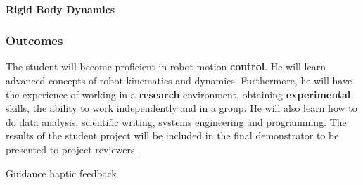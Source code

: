 \paragraph{Rigid Body Dynamics} 

\subsubsection{Outcomes}
The student will become proficient in robot motion \textbf{control}. He will learn advanced concepts of robot kinematics and dynamics.
Furthermore, he will have the experience of working in a \textbf{research} environment, obtaining \textbf{experimental} skills, the ability to work independently and in a group. He will also learn how to do data analysis, scientific writing, systems engineering and programming.
The results of the student project will be included in the final demonstrator to be presented to project reviewers.


Guidance
haptic feedback